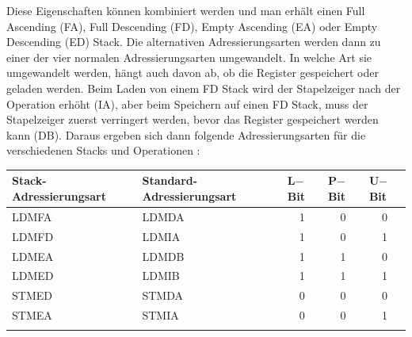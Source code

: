 \documentclass[a4paper, 11pt, onecolumn]{article}
\begin{document}
Diese Eigenschaften können kombiniert werden und man erhält einen Full Ascending (FA), Full Descending (FD), Empty Ascending (EA) oder Empty Descending (ED) Stack. Die alternativen Adressierungsarten werden dann zu einer der vier normalen Adressierungsarten umgewandelt. In welche Art sie umgewandelt werden, hängt auch davon ab, ob die Register gespeichert oder geladen werden. Beim Laden von einem FD Stack wird der Stapelzeiger nach der Operation erhöht (IA), aber beim Speichern auf einen FD Stack, muss der Stapelzeiger zuerst verringert werden, bevor das Register gespeichert werden kann (DB). Daraus ergeben sich dann folgende Adressierungsarten für die verschiedenen Stacks und Operationen \cite{arm:2005}:

\begin{table}[!htb]
\renewcommand*{\arraystretch}{1.25}
\begin{tabular}{llccc}
\hline
\textbf{Stack-Adressierungsart} & \textbf{Standard-Adressierungsart} & \multicolumn{1}{l}{\textbf{L$-$Bit}} & \multicolumn{1}{l}{\textbf{P$-$Bit}} & \multicolumn{1}{l}{\textbf{U$-$Bit}} \\ \hline
LDMFA                           & LDMDA                              & 1                                    & 0                                    & 0                                    \\ \arrayrulecolor[gray]{.7}\hline
LDMFD                           & LDMIA                              & 1                                    & 0                                    & 1                                    \\ \arrayrulecolor[gray]{.7}\hline
LDMEA                           & LDMDB                              & 1                                    & 1                                    & 0                                    \\ \arrayrulecolor[gray]{.7}\hline
LDMED                           & LDMIB                              & 1                                    & 1                                    & 1                                    \\ \arrayrulecolor[gray]{.7}\hline
STMED                           & STMDA                              & 0                                    & 0                                    & 0                                    \\ \arrayrulecolor[gray]{.7}\hline
STMEA                           & STMIA                              & 0                                    & 0                                    & 1                                    \\ \arrayrulecolor[gray]{.7}\hline

\end{tabular}
\end{table}
\end{document}
